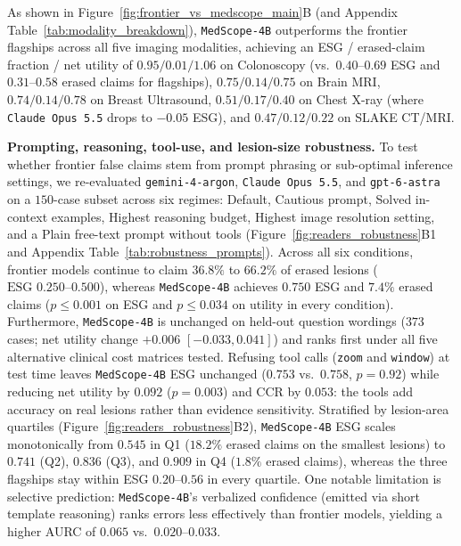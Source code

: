 \documentclass{article} %
\begin{document}
As shown in Figure~\ref{fig:frontier_vs_medscope_main}B (and Appendix Table~\ref{tab:modality_breakdown}), \texttt{MedScope-4B} outperforms the frontier flagships across all five imaging modalities, achieving an ESG / erased-claim fraction / net utility of $0.95 / 0.01 / 1.06$ on Colonoscopy (vs.\ $0.40\text{--}0.69$ ESG and $0.31\text{--}0.58$ erased claims for flagships), $0.75 / 0.14 / 0.75$ on Brain MRI, $0.74 / 0.14 / 0.78$ on Breast Ultrasound, $0.51 / 0.17 / 0.40$ on Chest X-ray (where \texttt{Claude Opus 5.5} drops to $-0.05$ ESG), and $0.47 / 0.12 / 0.22$ on SLAKE CT/MRI.

\textbf{Prompting, reasoning, tool-use, and lesion-size robustness.} To test whether frontier false claims stem from prompt phrasing or sub-optimal inference settings, we re-evaluated \texttt{gemini-4-argon}, \texttt{Claude Opus 5.5}, and \texttt{gpt-6-astra} on a $150$-case subset across six regimes: Default, Cautious prompt, Solved in-context examples, Highest reasoning budget, Highest image resolution setting, and a Plain free-text prompt without tools (Figure~\ref{fig:readers_robustness}B1 and Appendix Table~\ref{tab:robustness_prompts}). Across all six conditions, frontier models continue to claim $36.8\%$ to $66.2\%$ of erased lesions ($\text{ESG } 0.250\text{--}0.500$), whereas \texttt{MedScope-4B} achieves $0.750$ ESG and $7.4\%$ erased claims ($p \le 0.001$ on ESG and $p \le 0.034$ on utility in every condition). Furthermore, \texttt{MedScope-4B} is unchanged on held-out question wordings ($373$ cases; net utility change $+0.006$ $[-0.033, 0.041]$) and ranks first under all five alternative clinical cost matrices tested. Refusing tool calls (\texttt{zoom} and \texttt{window}) at test time leaves \texttt{MedScope-4B} ESG unchanged ($0.753$ vs.\ $0.758$, $p = 0.92$) while reducing net utility by $0.092$ ($p = 0.003$) and CCR by $0.053$: the tools add accuracy on real lesions rather than evidence sensitivity. Stratified by lesion-area quartiles (Figure~\ref{fig:readers_robustness}B2), \texttt{MedScope-4B} ESG scales monotonically from $0.545$ in Q1 ($18.2\%$ erased claims on the smallest lesions) to $0.741$ (Q2), $0.836$ (Q3), and $0.909$ in Q4 ($1.8\%$ erased claims), whereas the three flagships stay within ESG $0.20\text{--}0.56$ in every quartile. One notable limitation is selective prediction: \texttt{MedScope-4B}'s verbalized confidence (emitted via short template reasoning) ranks errors less effectively than frontier models, yielding a higher AURC of $0.065$ vs.\ $0.020\text{--}0.033$.
\end{document}
